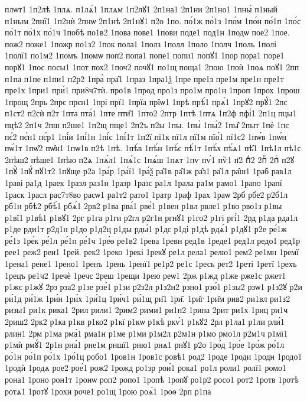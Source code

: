 {плѡт1
1п2лѣ
1плѧ.
п1лѧ́1
1плѧм
1п2лꙋ1
2п1на1
2п1ни
2п1но1
1пны́
п1ный
п1ным
2пнї1
1п2нѝ
2пнѡ
2п1нѣ
2п1нꙋ1
п2о
1по.
по́1ж
по́1з
1по́м
1по́н
по́1п
1по́с
по́1т
по́1х
по́1ч
1побѣ
по1в2
1пова
пове1
1пови
поде1
под1н
1подѡ
пое2
1пое.
пож2
поже1
1пожр
по1з2
1пок
пола1
1полз
1полл
1поло
1полч
1поль
1полі
1полї1
по1м2
1помъ
1помѡ
поп2
попа1
попе1
попи1
попꙋ1
1пор
пора1
поре1
порꙋ1
1пос
посы1
1пот
пох2
1поч2
почꙋ1
по1щ
поща1
2пою
1поѝ
1поѧ
поꙋ1
2пп
п1па
п1пе
п1пи1
п2р2
1пра̀
пра̑1
1праз
1пра1ѯ
1пре
пре1з
пре1м
пре1н
пре1т
пре1х
1при1
при́1
при8ч7тѝ.
про1в
1прод
про1з
про1м
про1н
1проп
1прох
1прош
1прощ
2прь
2прє
прєн1
1прі
прї1
1прїа
прїѡ1
1прѣ
прѣ́1
прѧ́1
1прꙋ2
прꙋ́1
2пс
п1ст2
п2сѝ
п2т
1пта
пта́1
1пте
пти̑1
1пто2
2птр
1птѣ
1птѧ
1п2ф
пфі́1
2п1ц
пцы1
пцѣ2
2п1ч
2пш
п2ше1
1п2щ
пще1
2п2ъ
п2ы
1пы.
1пы̀
1пы́2
1пы̑
2пыт
1пѐ
1пє
пє́2
пє́н1
пє́р1
1пі́и
1пі́1н
1пі́с
1пі́1т
1п2ї
пї1к
пї1л
пї1м
пїо́1
пї1с2
1пѡ́в
1пѡ́н
пѡ́1т
1пѡ̑2
пѡ̑н1
1пѡ1в
п2ѣ
1пѣ.
1пѣ́в
1пѣ́н
1пѣ́с
пѣ́1т
1пѣ́х
пѣ́ѧ1
пѣ̑1
1пѣ1л
пѣ1с
2пѣш2
пѣше1
1пѣю
п2ѧ
1пѧ́л1
1пѧ́1с
1пѧ́ш
1пѧт
1пѵ
пѵ́1
пѷ1
п҃2
пⷣ2
2пⷬ
2пⷭ
п2ꙋ
1пꙋ̀
1пꙋ́
пꙋ1т2
1пꙋще
р2а
1ра́р
1ра́ї1
1ра́ѯ
ра̑1в
ра̑1ж
ра̑з1
ра̑1л
ра̑ш1
1раб
рав1л
1раві
ра1д
1раек
1разл
раз1н
1разр
1разс
ра1л
1рала
ра1м
рамо1
1рапо
1рапї
1раск
1расл
рас7т8во
расѡ1
ра1т2
рато1
1ратр
1раф
1рах
1раѡ
2рб
рбе2
р2б1л
рб1н
рбѣ2
рбѣ́1
рбѧ́1
2рв2
р1ва
рва́1
рве́1
р1вен
р1вл
рвле1
р1во
рво1з
р1вы
р1вї1
р1вѣ1
р1вꙋ1
2рг
р1га
р1ги
р2гл
р2г1н
ргнꙋ1
р1го2
р1гі
ргі́1
2рд
р1да
рда1л
р1де
рди1т
р2д1н
р1до
р1д2ц
р1ды
рды́1
р1дє
р1ді
р1дѣ
рдѧ́1
р1дꙋ1
р2е
ре́1ж
ре́1з
1ре́к
ре́1л
ре́1п
ре́1ч
1ре́ѳ
ре1в2
1рева
1ревн
ред1в
1реде1
ред1л
редо1
ред1р
рее1
реж2
реи1
1рей.
рек2
1реко
1рекі
1рекꙋ
ре1л
рела1
релю1
рем2
ре1мн
1ремї
1рена1
рене1
1рено1
1ренъ
1рень
1ренї1
ре1р2
ре1с
1ресь
рет2
1реті
1ретї
1рехъ
1рецъ
ре1ч2
1речѐ
1речє
2реш
1рещи
1рею
реѡ1
2рж
р1жд
р1же
рже1с
ржет1
р1жє
р1жꙋ
2рз
рза2
р1зе
рзе́1
р1зи
р2з2л
р1з2н2
рзно1
рзо́1
р1зы2
рзѡ1
р1з2ꙋ
р2и
ри́1д
ри́1ж
1ри́н
1ри́х
1ри́1ц
1ри́ч1
ри́1щ
ри̑1
1ри̑.
1ри̑г
1ри̑м
рив2
ри1вл
ри1з2
ризы1
ри1к
рика1
2рил
рили1
2рим2
рими1
ри1н2
1рина
2рит
ри1х
1риц
ри1ч
2риш2
2рк2
р1ка
р1кв
р1ко2
р1кї
р1кѡ
р1кѣ
ркѵ́1
р1кꙋ2
2рл
р1ла1
р1ли
рли́1
рлин1
2рм
р1ма
рма́1
рма1н
р1ме
р1ми
р1м2л
р2м1н
р1мо
рмо1л
р2м1ч
р1мї1
р1мѝ
рмꙋ́1
2р1н
рна́1
рне1м
рншї1
рню1
рнѧ1
рнꙋ1
р2о
1ро́д
1ро́е
1ро́ж
ро́1л
ро́1н
ро́1п
ро́1х
1ро́1ц
робо1
1ров1н
1ров1с
ровѣ1
род2
1роде
1роди
1родн
1родо1
1родѝ
1родѧ
рое2
рое́1
рож2
1рожд
ро1зр
рои́1
рока1
ро1л
роли1
ролї1
ромо1
рона1
1роно
рон1т
1ронѡ
роп2
ропо1
1ропѣ
1ропꙋ
ро1р2
росо1
рот2
1ротв
1ротѣ
ротѧ1
1ротꙋ
1рохи
роче1
ро1щ
1рою
роѧ́1
1роѳ
2рп
р1па
}
